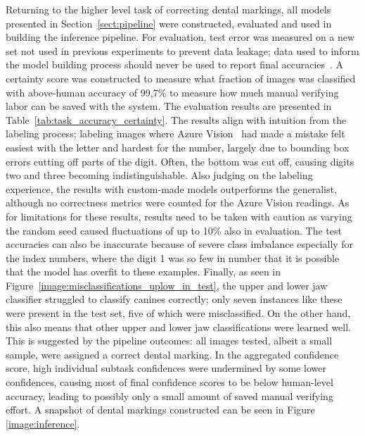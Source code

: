 \documentclass[english,twoside,openright]{UH_DS_MSc}
\begin{document}
Returning to the higher level task of correcting dental markings, all models presented in Section~\ref{sect:pipeline} were constructed, evaluated and used 
in building the inference pipeline. For evaluation, test error was measured on a new set not used in previous experiments 
to prevent data leakage; data used to inform the model building process should never be used to report final accuracies~\cite{engbook}.
A certainty score was constructed to measure what fraction of images was classified with above-human accuracy of 99,7\% to measure 
how much manual verifying labor can be saved with the system. The evaluation results are presented in Table~\ref{tab:task_accuracy_certainty}.
The results align with intuition from the labeling process; labeling images 
where Azure Vision~\cite{azurevision} had made a mistake felt easiest 
with the letter and hardest for the number, largely due to bounding box errors 
cutting off parts of the digit. Often, the bottom was cut off, causing digits two and three becoming indistinguishable. Also judging on the labeling experience,
the results with custom-made models outperforms the generalist, although no 
correctness metrics were counted for the Azure Vision readings. 
As for limitations for these results, results need to 
be taken with caution as varying the random seed caused fluctuations of 
up to 10\% also in evaluation. The test accuracies can also be inaccurate because 
of severe class imbalance especially for the index numbers, where the digit 1 was so few
in number that it is possible that the model has overfit to these examples.
Finally, as seen in Figure~\ref{image:misclassifications_uplow_in_test},
the upper and lower jaw classifier struggled to classify canines correctly;
only seven instances like these were present in the test set, five of 
which were misclassified. On the other hand, this also means that other upper 
and lower jaw classifications were learned well. This is suggested by 
the pipeline outcomes: all images tested, albeit a small sample, were 
assigned a correct dental marking. In the aggregated confidence score, 
high individual subtask confidences were undermined by some lower confidences, 
causing most of final confidence scores to be below human-level accuracy, leading 
to possibly only a small amount of saved manual verifying effort. 
A snapshot of dental markings constructed can be seen in Figure \ref{image:inference}.
\end{document}
